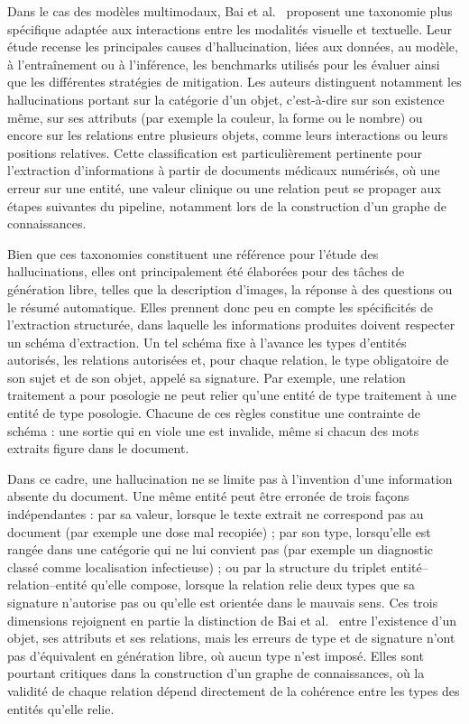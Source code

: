 Dans le cas des modèles multimodaux, Bai et al.~\cite{bai2025survey} proposent une taxonomie plus spécifique adaptée aux interactions entre les modalités visuelle et textuelle. Leur étude recense les principales causes d'hallucination, liées aux données, au modèle, à l'entraînement ou à l'inférence, les benchmarks utilisés pour les évaluer ainsi que les différentes stratégies de mitigation. Les auteurs distinguent notamment les hallucinations portant sur la catégorie d'un objet, c'est-à-dire sur son existence même, sur ses attributs (par exemple la couleur, la forme ou le nombre) ou encore sur les relations entre plusieurs objets, comme leurs interactions ou leurs positions relatives. Cette classification est particulièrement pertinente pour l'extraction d'informations à partir de documents médicaux numérisés, où une erreur sur une entité, une valeur clinique ou une relation peut se propager aux étapes suivantes du pipeline, notamment lors de la construction d'un graphe de connaissances.

Bien que ces taxonomies constituent une référence pour l'étude des hallucinations, elles ont principalement été élaborées pour des tâches de génération libre, telles que la description d'images, la réponse à des questions ou le résumé automatique. Elles prennent donc peu en compte les spécificités de l'extraction structurée, dans laquelle les informations produites doivent respecter un schéma d'extraction. Un tel schéma fixe à l'avance les types d'entités autorisés, les relations autorisées et, pour chaque relation, le type obligatoire de son sujet et de son objet, appelé sa signature. Par exemple, une relation \og traitement a pour posologie \fg{} ne peut relier qu'une entité de type traitement à une entité de type posologie. Chacune de ces règles constitue une contrainte de schéma : une sortie qui en viole une est invalide, même si chacun des mots extraits figure dans le document.

Dans ce cadre, une hallucination ne se limite pas à l'invention d'une information absente du document. Une même entité peut être erronée de trois façons indépendantes : par sa valeur, lorsque le texte extrait ne correspond pas au document (par exemple une dose mal recopiée) ; par son type, lorsqu'elle est rangée dans une catégorie qui ne lui convient pas (par exemple un diagnostic classé comme localisation infectieuse) ; ou par la structure du triplet entité--relation--entité qu'elle compose, lorsque la relation relie deux types que sa signature n'autorise pas ou qu'elle est orientée dans le mauvais sens. Ces trois dimensions rejoignent en partie la distinction de Bai et al.~\cite{bai2025survey} entre l'existence d'un objet, ses attributs et ses relations, mais les erreurs de type et de signature n'ont pas d'équivalent en génération libre, où aucun type n'est imposé. Elles sont pourtant critiques dans la construction d'un graphe de connaissances, où la validité de chaque relation dépend directement de la cohérence entre les types des entités qu'elle relie.

